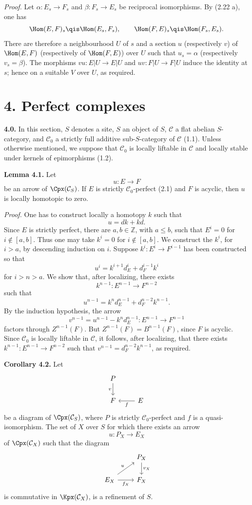 \documentclass[11pt]{article}
\begin{document}
\emph{Proof.} Let \(\alpha:E_s\to F_s\) and \(\beta:F_s\to E_s\) be reciprocal isomorphisms. By (2.22 a), one has
\[
  \Hom(E,F)_s\qis\Hom(E_s,F_s),
  \qquad
  \Hom(F,E)_s\qis\Hom(F_s,E_s).
\]
There are therefore a neighbourhood \(U\) of \(s\) and a section \(u\) (respectively \(v\)) of \(\Hom(E,F)\) (respectively of \(\Hom(F,E)\)) over \(U\) such that \(u_s=\alpha\) (respectively \(v_s=\beta\)). The morphisms \(vu:E|U\to E|U\) and \(uv:F|U\to F|U\) induce the identity at \(s\); hence on a suitable \(V\) over \(U\), as required.

\section*{4. Perfect complexes}

\textbf{4.0.} In this section, \(S\) denotes a site, \(S\) an object of \(S\), \(\mathcal C\) a flat abelian \(S\)-category, and \(\mathcal C_0\) a strictly full additive sub-\(S\)-category of \(\mathcal C\) (1.1). Unless otherwise mentioned, we suppose that \(\mathcal C_0\) is locally liftable in \(\mathcal C\) and locally stable under kernels of epimorphisms (1.2).

\textbf{Lemma 4.1.} Let
\[
  u:E\longrightarrow F
\]
be an arrow of \(\Cpx(\mathcal C_S)\). If \(E\) is strictly \(\mathcal C_0\)-perfect (2.1) and \(F\) is acyclic, then \(u\) is locally homotopic to zero.

\emph{Proof.} One has to construct locally a homotopy \(k\) such that
\[
  u=dk+kd.
\]
Since \(E\) is strictly perfect, there are \(a,b\in\mathbb Z\), with \(a\leq b\), such that \(E^i=0\) for \(i\notin[a,b]\). Thus one may take \(k^i=0\) for \(i\notin[a,b]\). We construct the \(k^i\), for \(i>a\), by descending induction on \(i\). Suppose \(k^i:E^i\to F^{i-1}\) has been constructed so that
\[
  u^i=k^{i+1}d_E^i+d_F^{i-1}k^i
\]
for \(i>n>a\). We show that, after localizing, there exists
\[
  k^{n-1}:E^{n-1}\longrightarrow F^{n-2}
\]
such that
\[
  u^{n-1}=k^n d_E^{n-1}+d_F^{n-2}k^{n-1}.
\]
By the induction hypothesis, the arrow
\[
  v^{n-1}=u^{n-1}-k^n d_E^{n-1}:E^{n-1}\longrightarrow F^{n-1}
\]
factors through \(Z^{n-1}(F)\). But \(Z^{n-1}(F)=B^{n-1}(F)\), since \(F\) is acyclic. Since \(\mathcal C_0\) is locally liftable in \(\mathcal C\), it follows, after localizing, that there exists \(k^{n-1}:E^{n-1}\to F^{n-2}\) such that \(v^{n-1}=d_F^{n-2}k^{n-1}\), as required.

\textbf{Corollary 4.2.} Let
\[
\begin{tikzcd}
P \arrow[d,"v"'] \\
F & E \arrow[l,"f"]
\end{tikzcd}
\]
be a diagram of \(\Cpx(\mathcal C_S)\), where \(P\) is strictly \(\mathcal C_0\)-perfect and \(f\) is a quasi-isomorphism. The set of \(X\) over \(S\) for which there exists an arrow
\[
  u:P_X\longrightarrow E_X
\]
of \(\Cpx(\mathcal C_X)\) such that the diagram
\[
\begin{tikzcd}
& P_X \arrow[d,"v_X"]\\
E_X \arrow[r,"f_X"'] \arrow[ur,"u"] & F_X
\end{tikzcd}
\]
is commutative in \(\Kpx(\mathcal C_X)\), is a refinement of \(S\).
\end{document}
